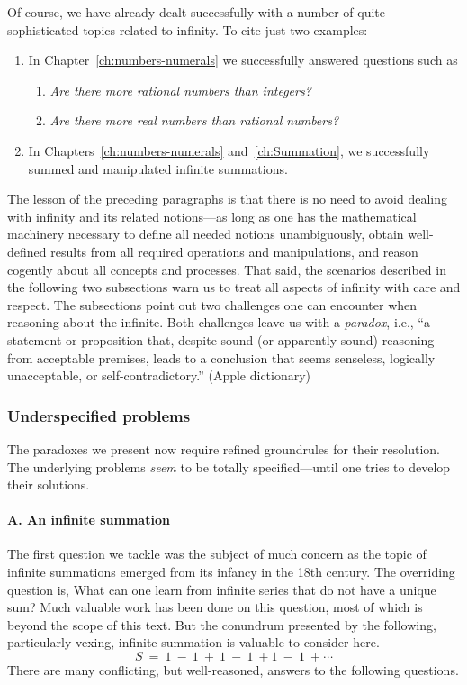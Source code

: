 Of course, we have already dealt successfully with a number of quite
sophisticated topics related to infinity.  To cite just two examples:
\begin{enumerate}
\item
In Chapter~\ref{ch:numbers-numerals} we successfully answered questions
such as
  \begin{enumerate}
  \item
{\it Are there more rational numbers than integers?}
  \item
{\it Are there more real numbers than rational numbers?}
  \end{enumerate}

\item
In Chapters~\ref{ch:numbers-numerals} and~\ref{ch:Summation}, we
successfully summed and manipulated infinite summations.
\end{enumerate}

The lesson of the preceding paragraphs is that there is no need to
avoid dealing with infinity and its related notions---as long as one
has the mathematical machinery necessary to define all needed notions
unambiguously, obtain well-defined results from all required
operations and manipulations, and reason cogently about all concepts
and processes.  That said, the scenarios described in the following
two subsections warn us to treat all aspects of infinity with care and
respect.  The subsections point out two challenges one can encounter
when reasoning about the infinite.  Both challenges leave us with a
{\em paradox}, i.e., ``a statement or proposition that, despite sound
(or apparently sound) reasoning from acceptable premises, leads to a
conclusion that seems senseless, logically unacceptable, or
self-contradictory.''  {\small (Apple dictionary)}


\subsubsection{Underspecified problems}
\label{sec:underspecified}

The paradoxes we present now require refined groundrules for their
resolution.  The underlying problems {\em seem} to be totally
specified---until one tries to develop their solutions.

\paragraph{A. An infinite summation}

The first question we tackle was the subject of much concern as the
topic of infinite summations emerged from its infancy in the 18th
century.  The overriding question is, What can one learn from infinite
series that do not have a unique sum?  Much valuable work has been done on
this question, most of which is beyond the scope of this text.  But the
conundrum presented by the following, particularly vexing, infinite
summation is valuable to consider here.
\[ S \ = \ 1 \ - \ 1 \ + \ 1 \ - \ 1 \ + 1 \ - \ 1 \ + \cdots \]
There are many conflicting, but well-reasoned, answers to the following
questions.
\medskip

